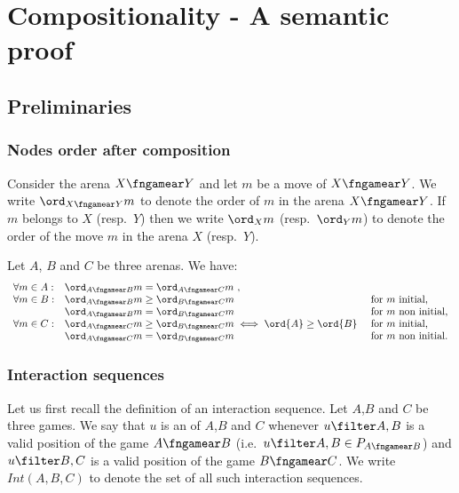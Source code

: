 \section{Compositionality - A semantic proof}

\subsection{Preliminaries}

\subsubsection{Nodes order after composition}

Consider the arena $X\fngamear Y$
and let $m$ be a move of $X\fngamear Y$.
We write $\ord_{X\fngamear Y}{m}$
to denote the order of
$m$ in the arena ${X\fngamear Y}$.
If $m$ belongs to $X$ (resp.~$Y$) then
we write $\ord_X{m}$
(resp.~$\ord_Y{m}$) to denote the order of the move $m$ in the arena $X$ (resp.~$Y$).

\begin{lemma}
\label{lem:compositionorder}
Let $A$, $B$ and $C$ be three arenas. We have:
$$\begin{array}{lll}
\forall m \in A:
    &  \ord_{A\fngamear B}{m} = \ord_{A\fngamear C}{m} \ ,\\
\forall m \in B:
    & \ord_{A\fngamear B}{m} \geq \ord_{B\fngamear C}{m}  & \mbox{for $m$ initial,}\\
    & \ord_{A\fngamear B}{m} = \ord_{B\fngamear C}{m} & \mbox{for $m$ non initial,} \\
\forall m \in C:
    & \ord_{A\fngamear C}{m} \geq \ord_{B\fngamear C}{m} \iff
\ord{A} \geq \ord{B}\ & \mbox{for $m$ initial,}\\
    & \ord_{A\fngamear C}{m} = \ord_{B\fngamear C}{m}   & \mbox{for $m$ non initial.}
\end{array}
$$
\end{lemma}





\subsubsection{Interaction sequences}
Let us first recall the definition of an interaction sequence.
Let $A$,$B$ and $C$ be three games.
We say that $u$  is an  of $A$,$B$ and $C$ whenever $u\filter A,B$ is a valid position of the game $A\fngamear B$
(i.e.~$u\filter A,B \in P_{A\fngamear B}$)
and  $u\filter B,C$ is a valid position of the game
$B\fngamear C$. We write $Int(A,B,C)$ to denote
the set of all such interaction sequences.

